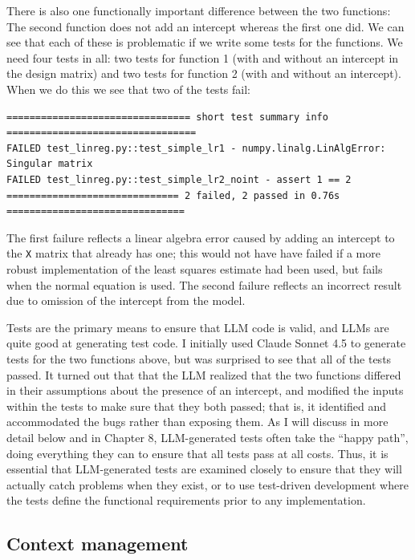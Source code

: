 There is also one functionally important difference between the two functions: The second function does not add an intercept whereas the first one did. We can see that each of these is problematic if we write some tests for the functions. We need four tests in all: two tests for function 1 (with and without an intercept in the design matrix) and two tests for function 2 (with and without an intercept). When we do this we see that two of the tests fail:

\begin{lstlisting}
================================ short test summary info =================================
FAILED test_linreg.py::test_simple_lr1 - numpy.linalg.LinAlgError: Singular matrix
FAILED test_linreg.py::test_simple_lr2_noint - assert 1 == 2
============================== 2 failed, 2 passed in 0.76s ===============================
\end{lstlisting}

The first failure reflects a linear algebra error caused by adding an intercept to the \texttt{X} matrix that already has one; this would not have have failed if a more robust implementation of the least squares estimate had been used, but fails when the normal equation is used. The second failure reflects an incorrect result due to omission of the intercept from the model.

Tests are the primary means to ensure that LLM code is valid, and LLMs are quite good at generating test code.
I initially used Claude Sonnet 4.5 to generate tests for the two functions above, but was surprised to see that all of the tests passed.
It turned out that that the LLM realized that the two functions differed in their assumptions about the presence of an intercept, and modified the inputs within the tests to make sure that they both passed; that is, it identified and accommodated the bugs rather than exposing them.
As I will discuss in more detail below and in Chapter 8, LLM-generated tests often take the ``happy path'', doing everything they can to ensure that all tests pass at all costs.
Thus, it is essential that LLM-generated tests are examined closely to ensure that they will actually catch problems when they exist, or to use test-driven development where the tests define the functional requirements prior to any implementation.

\subsection{Context management}

